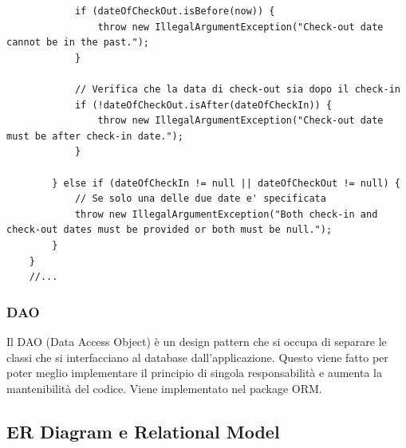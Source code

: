 \documentclass[10pt]{article}
\begin{document}
\begin{lstlisting}
            if (dateOfCheckOut.isBefore(now)) {
                throw new IllegalArgumentException("Check-out date cannot be in the past.");
            }

            // Verifica che la data di check-out sia dopo il check-in
            if (!dateOfCheckOut.isAfter(dateOfCheckIn)) {
                throw new IllegalArgumentException("Check-out date must be after check-in date.");
            }

        } else if (dateOfCheckIn != null || dateOfCheckOut != null) {
            // Se solo una delle due date e' specificata
            throw new IllegalArgumentException("Both check-in and check-out dates must be provided or both must be null.");
        }
    }
    //...
\end{lstlisting}
\par\medskip
\label{daosec}
\subsubsection{DAO}

Il DAO (Data Access Object) è un design pattern che si occupa di separare le classi che si interfacciano al database dall'applicazione. Questo viene fatto
per poter meglio implementare il principio di singola responsabilità e aumenta
la mantenibilità del codice. Viene implementato nel package ORM.

\subsection{ER Diagram e Relational Model}
\end{document}
